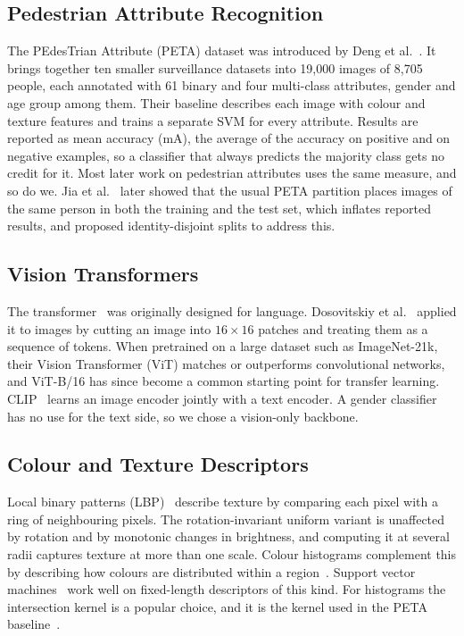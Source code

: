 \documentclass[conference]{IEEEtran}
\begin{document}
\subsection{Pedestrian Attribute Recognition}
The PEdesTrian Attribute (PETA) dataset was introduced by Deng et
al.~\cite{deng2014peta}. It brings together ten smaller surveillance datasets into
19,000 images of 8,705 people, each annotated with 61 binary and four multi-class
attributes, gender and age group among them. Their baseline describes each image
with colour and texture features and trains a separate SVM for every attribute.
Results are reported as mean accuracy (mA), the average of the accuracy on
positive and on negative examples, so a classifier that always predicts the
majority class gets no credit for it. Most later work on pedestrian attributes uses
the same measure, and so do we. Jia et al.~\cite{jia2021rethinking} later showed
that the usual PETA partition places images of the same person in both the training
and the test set, which inflates reported results, and proposed identity-disjoint
splits to address this.

\subsection{Vision Transformers}
The transformer~\cite{vaswani2017attention} was originally designed for language.
Dosovitskiy et al.~\cite{dosovitskiy2021vit} applied it to images by cutting an
image into $16\times16$ patches and treating them as a sequence of tokens. When
pretrained on a large dataset such as ImageNet-21k, their Vision Transformer (ViT)
matches or outperforms convolutional networks, and ViT-B/16 has since become a
common starting point for transfer learning. CLIP~\cite{radford2021clip} learns an
image encoder jointly with a text encoder. A gender classifier has no use for the
text side, so we chose a vision-only backbone.

\subsection{Colour and Texture Descriptors}
Local binary patterns (LBP)~\cite{ojala2002lbp} describe texture by comparing each
pixel with a ring of neighbouring pixels. The rotation-invariant uniform variant is
unaffected by rotation and by monotonic changes in brightness, and computing it at
several radii captures texture at more than one scale. Colour histograms complement
this by describing how colours are distributed within a
region~\cite{swain1991color}. Support vector machines~\cite{cortes1995svm} work
well on fixed-length descriptors of this kind. For histograms the intersection
kernel is a popular choice, and it is the kernel used in the PETA
baseline~\cite{deng2014peta}.
\end{document}
